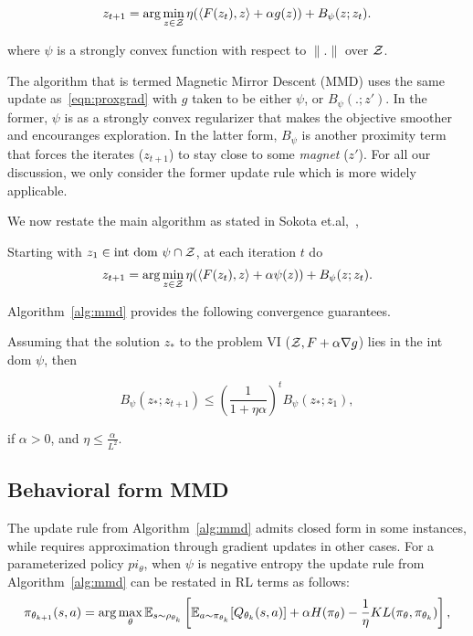 \begin{equation}
	\label{eqn:proxgrad} z_{t+1} = \arg \min_{z \in \mathcal{Z}} \eta (\langle F(z_t), z\rangle + \alpha
	g(z)) + B_{\psi} (z; z_t).
\end{equation}

where $\psi$ is a strongly convex function with respect to $\|.\|$ over $\mathcal{Z}$.

The algorithm that is termed Magnetic Mirror Descent (MMD) uses the same update as~\ref{eqn:proxgrad} with $g$ taken to be
either $\psi$, or $B_{\psi}(.;z')$. In the former, $\psi$ is as a strongly convex regularizer that makes the objective smoother and encouranges 
exploration. In the latter form, $B_{\psi}$ is another proximity term that forces the iterates ($z_{t+1}$) to stay close to some  
\textit{magnet} ($z'$). For all our discussion, we only consider the former update rule which is more widely 
applicable.

We now restate the main algorithm as stated in Sokota et.al,~\cite{sokotaUnified2023},

\begin{alprocedure}[H]  \label{alg:mmd} Starting with $z_1 \in \text{int dom } \psi \cap \mathcal{Z}$,
	at each iteration $t$ do $$ z_{t+1} = \arg \min_{z \in \mathcal{Z}} \eta (\langle F(z_t), z\rangle +
		\alpha \psi(z)) + B_{\psi} (z; z_t).
	$$
\end{alprocedure}

\hfill \break
Algorithm~\ref{alg:mmd} provides the following convergence guarantees.
\begin{theorem}
	\label{thm:mmdconv}
	\cite[Theorem 3.4]{sokotaUnified2023}
	Assuming that the solution $z_{\ast}$ to the problem VI ($\mathcal{Z}, F + \alpha \nabla g$) lies in the
	int dom $\psi$, then

	\[ B_{\psi} (z_{\ast}; z_{t + 1}) \leq {\left(\frac{1}{1 +
				\eta \alpha}\right)}^t B_{\psi} (z_{\ast}; z_1), \]

	if $\alpha > 0$, and $\eta
		\leq \frac{\alpha}{L^2}$.
\end{theorem}

\subsection{Behavioral form MMD}

The update rule from Algorithm~\ref{alg:mmd} admits closed form in some instances, while requires approximation 
through gradient updates in other cases.
For a parameterized policy $pi_\theta$, when $\psi$ is negative entropy the update rule from Algorithm~\ref{alg:mmd} can be restated in 
RL terms as follows:
\begin{equation}
	\label{eqn:mmdbf} \pi_{\theta_{k+1}}(s,a)
	= \arg \max_{\theta} \mathbb{E}_{s \sim \rho_{\theta_k}} \left[ \mathbb{E}_{a \sim \pi_{\theta_k}} [Q_{\theta_k}(s, a)] + \alpha H(\pi_\theta) - \frac{1}{\eta} KL(\pi_\theta, \pi_{\theta_k}) \right],
\end{equation}

